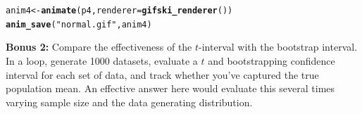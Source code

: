 \documentclass{article}\usepackage[]{graphicx}\usepackage[]{color}
\makeatletter
\newcommand{\hlstr}[1]{\textcolor[rgb]{0.192,0.494,0.8}{#1}}%
\newcommand{\hlstd}[1]{\textcolor[rgb]{0.345,0.345,0.345}{#1}}%
\newcommand{\hlkwb}[1]{\textcolor[rgb]{0.69,0.353,0.396}{#1}}%
\newcommand{\hlkwc}[1]{\textcolor[rgb]{0.333,0.667,0.333}{#1}}%
\newcommand{\hlkwd}[1]{\textcolor[rgb]{0.737,0.353,0.396}{\textbf{#1}}}%
\newenvironment{kframe}{%
 \def\at@end@of@kframe{}%
 \ifinner\ifhmode%
  \def\at@end@of@kframe{\end{minipage}}%
  \begin{minipage}{\columnwidth}%
 \fi\fi%
 \def\FrameCommand##1{\hskip\@totalleftmargin \hskip-\fboxsep
 \colorbox{shadecolor}{##1}\hskip-\fboxsep
     \hskip-\linewidth \hskip-\@totalleftmargin \hskip\columnwidth}%
 \MakeFramed {\advance\hsize-\width
   \@totalleftmargin\z@ \linewidth\hsize
   \@setminipage}}%
 {\par\unskip\endMakeFramed%
 \at@end@of@kframe}
\newenvironment{knitrout}{}{} %
\makeatother
\begin{document}
\begin{knitrout}
\begin{kframe}
\begin{alltt}
\hlstd{anim4} \hlkwb{<-} \hlkwd{animate}\hlstd{(p4,} \hlkwc{renderer} \hlstd{=} \hlkwd{gifski_renderer}\hlstd{())}
\hlkwd{anim_save}\hlstd{(}\hlstr{"normal.gif"}\hlstd{, anim4)}
\end{alltt}
\end{kframe}
\end{knitrout}

\noindent \textbf{Bonus 2:} Compare the effectiveness of the $t$-interval with the bootstrap interval. In a loop, generate 1000 datasets, evaluate a $t$ and bootstrapping confidence interval for each set of data, and track whether you've captured the true population mean. An effective answer here would evaluate this several times varying sample size and the data generating distribution.

\newpage

\end{document}
